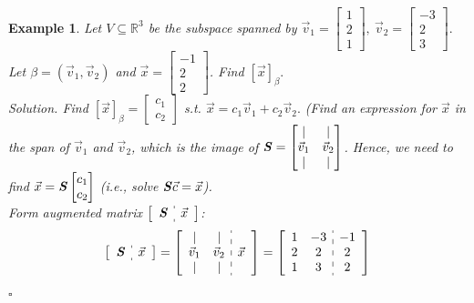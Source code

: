 \documentclass[12pt, a4paper]{article}
\newtheorem{eg}{Example}[subsection]
\newenvironment*{sol}{\indent\textit{Solution. }}{\hfill{$\square$}\par}
\def\R{{\mathbb{R}}}
\def\vecx{\vec{x}}
\def\vecv{\vec{v}}
\def\matrixS{\textbf{\emph{S}}}
\begin{document}
\begin{eg}
	Let $V\subseteq\R^3$ be the subspace spanned by $\vecv_1=\begin{bmatrix}1\\2\\1\end{bmatrix},\ \vecv_2=\begin{bmatrix}-3\\2\\3\end{bmatrix}.$ Let $\beta=(\vecv_1,\vecv_2)$ and $\vecx=\begin{bmatrix}-1\\2\\2\end{bmatrix}$. Find $[\vecx]_\beta.$	\\
	\begin{sol}
		Find $[\vecx]_\beta=\begin{bmatrix}c_1\\c_2\end{bmatrix}$ \emph{s.t.} $\vecx=c_1\vecv_1+c_2\vecv_2.$ (Find an expression for $\vecx$ in the span of $\vecv_1$ and $\vecv_2$, which is the image of $\matrixS=\begin{bmatrix}|&|\\\vecv_1&\vecv_2\\|&|\end{bmatrix}$. Hence, we need to find $\vecx=\matrixS\begin{bmatrix}c_1\\c_2\end{bmatrix}$ (i.e., solve $\matrixS\vec{c}=\vecx$).\\
		Form augmented matrix $\left[\begin{array}{c:c}\matrixS&\vecx\end{array}\right]$: 
		$$\begin{aligned}
			\left[\begin{array}{c:c}\matrixS&\vecx\end{array}\right]&=\left[\begin{array}{c:c}\begin{matrix}|&|\\\vecv_1&\vecv_2\\|&|\end{matrix}&\vecx\end{array}\right]=\left[\begin{array}{c:c}\begin{matrix}1&-3\\2&2\\1&3\end{matrix}&\begin{matrix}-1\\2\\2\end{matrix}\end{array}\right]\\

\end{aligned}$$
\end{sol}
\end{eg}
\end{document}
